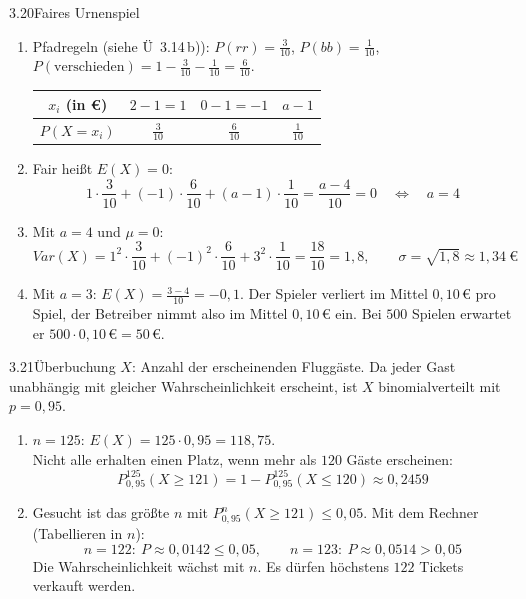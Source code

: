 \begin{loesung}{3.20}{Faires Urnenspiel}
\begin{enumerate}[label=\alph*)]
  \item Pfadregeln (siehe Ü~3.14\,b)): $P(rr) = \frac{3}{10}$, $P(bb) = \frac{1}{10}$, $P(\text{verschieden}) = 1-\frac{3}{10}-\frac{1}{10} = \frac{6}{10}$.
  \begin{center}\begin{tabular}{|c|c|c|c|}
    \hline
    $x_i$ (in €) & $2-1 = 1$ & $0-1 = -1$ & $a-1$\\
    \hline
    $P(X=x_i)$ & $\frac{3}{10}$ & $\frac{6}{10}$ & $\frac{1}{10}$\\
    \hline
  \end{tabular}\end{center}
  \item Fair heißt $E(X) = 0$:
  \[1\cdot\dfrac{3}{10}+(-1)\cdot\dfrac{6}{10}+(a-1)\cdot\dfrac{1}{10} = \dfrac{a-4}{10} = 0\quad\Longleftrightarrow\quad a = 4\]
  \item Mit $a=4$ und $\mu = 0$:
  \[Var(X) = 1^2\cdot\dfrac{3}{10}+(-1)^2\cdot\dfrac{6}{10}+3^2\cdot\dfrac{1}{10} = \dfrac{18}{10} = 1{,}8,\qquad\sigma = \sqrt{1{,}8}\approx 1{,}34\ \text{€}\]
  \item Mit $a=3$: $E(X) = \frac{3-4}{10} = -0{,}1$. Der Spieler verliert im Mittel $0{,}10$\,€ pro Spiel, der Betreiber nimmt also im Mittel $0{,}10$\,€ ein. Bei $500$ Spielen erwartet er $500\cdot 0{,}10\,\text{€} = 50$\,€.
\end{enumerate}
\end{loesung}

\begin{loesung}{3.21}{Überbuchung}
$X$: Anzahl der erscheinenden Fluggäste. Da jeder Gast unabhängig mit gleicher Wahrscheinlichkeit erscheint, ist $X$ binomialverteilt mit $p = 0{,}95$.
\begin{enumerate}[label=\alph*)]
  \item $n = 125$: $E(X) = 125\cdot 0{,}95 = 118{,}75$.\\
  Nicht alle erhalten einen Platz, wenn mehr als $120$ Gäste erscheinen:
  \[P^{125}_{0{,}95}(X\geq 121) = 1-P^{125}_{0{,}95}(X\leq 120)\approx 0{,}2459\]
  \item Gesucht ist das größte $n$ mit $P^{n}_{0{,}95}(X\geq 121)\leq 0{,}05$. Mit dem Rechner (Tabellieren in $n$):
  \[n = 122:\ P\approx 0{,}0142\leq 0{,}05,\qquad n = 123:\ P\approx 0{,}0514>0{,}05\]
  Die Wahrscheinlichkeit wächst mit $n$. Es dürfen höchstens $122$ Tickets verkauft werden.
\end{enumerate}
\end{loesung}

